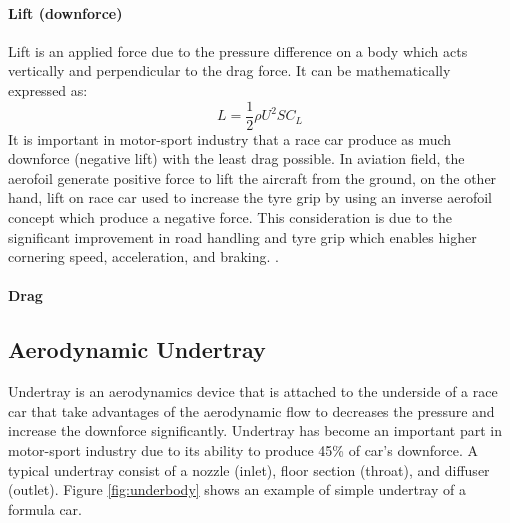 \paragraph{Lift (downforce)}
Lift is an applied force due to the pressure difference on a body which acts vertically and perpendicular to the drag force. It can be mathematically expressed as:
\begin{equation}
    L = \frac{1}{2}\rho U^2 S C_L
\end{equation}
It is important in motor-sport industry that a race car produce as much downforce (negative lift) with the least drag possible. In aviation field, the aerofoil generate positive force to lift the aircraft from the ground, on the other hand, lift on race car used to increase the tyre grip by using an inverse aerofoil concept which produce a negative force. This consideration is due to the significant improvement in road handling and tyre grip which enables higher cornering speed, acceleration, and braking. \cite{Barnard1997RoadIntroduction}.


\paragraph{Drag}















\subsection{Aerodynamic Undertray}
Undertray is an aerodynamics device that is attached to the underside of a race car that take advantages of the aerodynamic flow to decreases the pressure and increase the downforce significantly. Undertray has become an important part in motor-sport industry due to its ability to produce 45\% of car's downforce\cite{Katz1995RaceSpeed}. A typical undertray consist of a nozzle (inlet), floor section (throat), and diffuser (outlet).  Figure \ref{fig:underbody} shows an example of simple undertray of a formula car.

